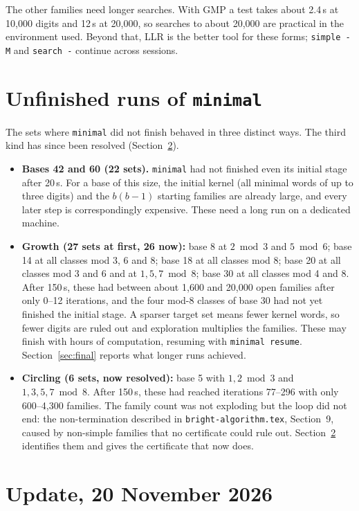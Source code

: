 \documentclass[11pt]{article}
\newcommand{\code}[1]{\texttt{#1}}
\begin{document}
The other families need longer searches. With GMP a test takes about 2.4\,s at 10{,}000 digits and 12\,s at 20{,}000, so searches to about 20{,}000 are practical in the environment used. Beyond that, LLR is the better tool for these forms; \code{simple - M} and \code{search -} continue across sessions.

\section{Unfinished runs of \code{minimal}}

The sets where \code{minimal} did not finish behaved in three distinct ways. The third kind has since been resolved (Section~\ref{sec:update}).

\begin{itemize}
\item \textbf{Bases 42 and 60 (22 sets).} \code{minimal} had not finished even its initial stage after 20\,s. For a base of this size, the initial kernel (all minimal words of up to three digits) and the $b(b-1)$ starting families are already large, and every later step is correspondingly expensive. These need a long run on a dedicated machine.
\item \textbf{Growth (27 sets at first, 26 now):} base 8 at $2 \bmod 3$ and $5 \bmod 6$; base 14 at all classes mod 3, 6 and 8; base 18 at all classes mod 8; base 20 at all classes mod 3 and 6 and at $1,5,7 \bmod 8$; base 30 at all classes mod 4 and 8. After 150\,s, these had between about 1{,}600 and 20{,}000 open families after only 0--12 iterations, and the four mod-8 classes of base 30 had not yet finished the initial stage. A sparser target set means fewer kernel words, so fewer digits are ruled out and exploration multiplies the families. These may finish with hours of computation, resuming with \code{minimal resume}. Section~\ref{sec:final} reports what longer runs achieved.
\item \textbf{Circling (6 sets, now resolved):} base 5 with $1,2 \bmod 3$ and $1,3,5,7 \bmod 8$. After 150\,s, these had reached iterations 77--296 with only 600--4{,}300 families. The family count was not exploding but the loop did not end: the non-termination described in \code{bright-algorithm.tex}, Section~9, caused by non-simple families that no certificate could rule out. Section~\ref{sec:update} identifies them and gives the certificate that now does.
\end{itemize}

\section{Update, 20 November 2026}\label{sec:update}
\end{document}

